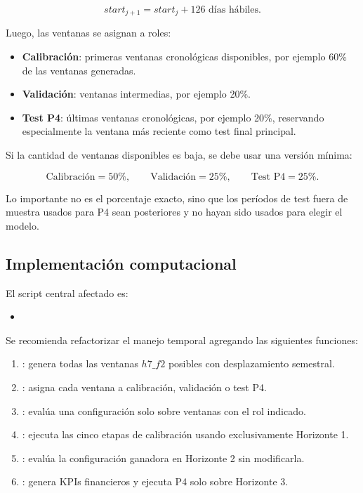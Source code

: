\documentclass[11pt]{article}
\begin{document}
\[
start_{j+1} = start_j + 126 \text{ d\'ias h\'abiles}.
\]

Luego, las ventanas se asignan a roles:

\begin{itemize}
    \item \textbf{Calibraci\'on}: primeras ventanas cronol\'ogicas disponibles, por ejemplo 60\% de las ventanas generadas.
    \item \textbf{Validaci\'on}: ventanas intermedias, por ejemplo 20\%.
    \item \textbf{Test P4}: \'ultimas ventanas cronol\'ogicas, por ejemplo 20\%, reservando especialmente la ventana m\'as reciente como test final principal.
\end{itemize}

Si la cantidad de ventanas disponibles es baja, se debe usar una versi\'on m\'inima:

\[
\text{Calibraci\'on} = 50\%, \qquad
\text{Validaci\'on} = 25\%, \qquad
\text{Test P4} = 25\%.
\]

Lo importante no es el porcentaje exacto, sino que los per\'iodos de test fuera de muestra usados para P4 sean posteriores y no hayan sido usados para elegir el modelo.

\subsection{Implementaci\'on computacional}

El script central afectado es:

\begin{itemize}
    \item {}
\end{itemize}

Se recomienda refactorizar el manejo temporal agregando las siguientes funciones:

\begin{enumerate}[label=\arabic*.]
    \item {}: genera todas las ventanas $h7\_f2$ posibles con desplazamiento semestral.
    \item {}: asigna cada ventana a calibraci\'on, validaci\'on o test P4.
    \item {}: eval\'ua una configuraci\'on solo sobre ventanas con el rol indicado.
    \item {}: ejecuta las cinco etapas de calibraci\'on usando exclusivamente Horizonte 1.
    \item {}: eval\'ua la configuraci\'on ganadora en Horizonte 2 sin modificarla.
    \item {}: genera KPIs financieros y ejecuta P4 solo sobre Horizonte 3.
\end{enumerate}
\end{document}
